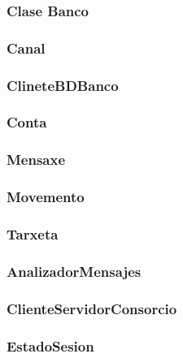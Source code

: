 \documentclass[a4paper,titlepage]{article}
\begin{document}
\subsubsection{Clase Banco}

\subsubsection{Canal}

\subsubsection{ClineteBDBanco}

\subsubsection{Conta}

\subsubsection{Mensaxe}

\subsubsection{Movemento}

\subsubsection{Tarxeta}

\subsubsection{AnalizadorMensajes}

\subsubsection{ClienteServidorConsorcio}

\subsubsection{EstadoSesion}

\end{document}
